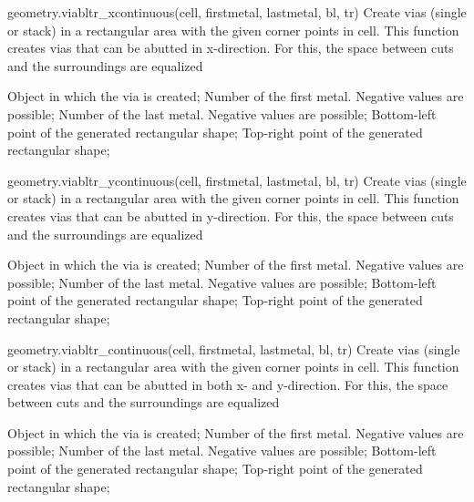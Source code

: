 \begin{APIfunc}{geometry.viabltr\_xcontinuous(cell, firstmetal, lastmetal, bl, tr)}
    Create vias (single or stack) in a rectangular area with the given corner points in cell. This function creates vias that can be abutted in x-direction. For this, the space between cuts and the surroundings are equalized
    \begin{APIparameters}
            Object in which the via is created;
            Number of the first metal. Negative values are possible;
            Number of the last metal. Negative values are possible;
            Bottom-left point of the generated rectangular shape;
            Top-right point of the generated rectangular shape;
    \end{APIparameters}
\end{APIfunc}
\begin{APIfunc}{geometry.viabltr\_ycontinuous(cell, firstmetal, lastmetal, bl, tr)}
    Create vias (single or stack) in a rectangular area with the given corner points in cell. This function creates vias that can be abutted in y-direction. For this, the space between cuts and the surroundings are equalized
    \begin{APIparameters}
            Object in which the via is created;
            Number of the first metal. Negative values are possible;
            Number of the last metal. Negative values are possible;
            Bottom-left point of the generated rectangular shape;
            Top-right point of the generated rectangular shape;
    \end{APIparameters}
\end{APIfunc}
\begin{APIfunc}{geometry.viabltr\_continuous(cell, firstmetal, lastmetal, bl, tr)}
    Create vias (single or stack) in a rectangular area with the given corner points in cell. This function creates vias that can be abutted in both x- and y-direction. For this, the space between cuts and the surroundings are equalized
    \begin{APIparameters}
            Object in which the via is created;
            Number of the first metal. Negative values are possible;
            Number of the last metal. Negative values are possible;
            Bottom-left point of the generated rectangular shape;
            Top-right point of the generated rectangular shape;
    \end{APIparameters}
\end{APIfunc}
